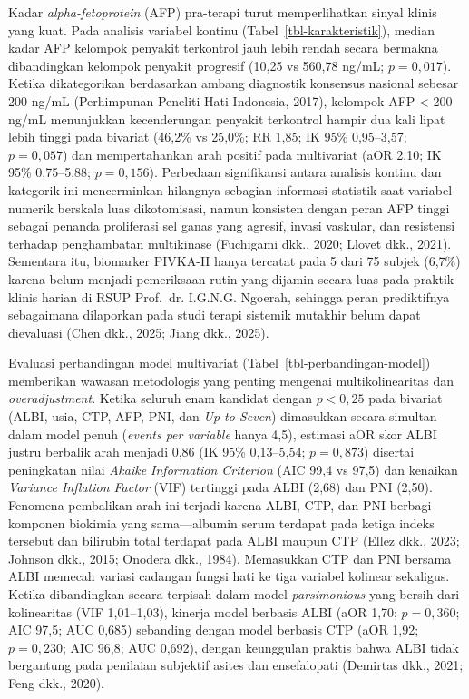 \documentclass[
  indonesian,
]{report}
\begin{document}
Kadar \emph{alpha-fetoprotein} (AFP) pra-terapi turut memperlihatkan
sinyal klinis yang kuat. Pada analisis variabel kontinu
(Tabel~\ref{tbl-karakteristik}), median kadar AFP kelompok penyakit
terkontrol jauh lebih rendah secara bermakna dibandingkan kelompok
penyakit progresif (10,25 vs 560,78 ng/mL; \(p = 0,017\)). Ketika
dikategorikan berdasarkan ambang diagnostik konsensus nasional sebesar
200 ng/mL (Perhimpunan Peneliti Hati Indonesia, 2017), kelompok AFP
\textless{} 200 ng/mL menunjukkan kecenderungan penyakit terkontrol
hampir dua kali lipat lebih tinggi pada bivariat (46,2\% vs 25,0\%; RR
1,85; IK 95\% 0,95--3,57; \(p = 0,057\)) dan mempertahankan arah positif
pada multivariat (aOR 2,10; IK 95\% 0,75--5,88; \(p = 0,156\)).
Perbedaan signifikansi antara analisis kontinu dan kategorik ini
mencerminkan hilangnya sebagian informasi statistik saat variabel
numerik berskala luas dikotomisasi, namun konsisten dengan peran AFP
tinggi sebagai penanda proliferasi sel ganas yang agresif, invasi
vaskular, dan resistensi terhadap penghambatan multikinase (Fuchigami
dkk., 2020; Llovet dkk., 2021). Sementara itu, biomarker PIVKA-II hanya
tercatat pada 5 dari 75 subjek (6,7\%) karena belum menjadi pemeriksaan
rutin yang dijamin secara luas pada praktik klinis harian di RSUP
Prof.~dr. I.G.N.G. Ngoerah, sehingga peran prediktifnya sebagaimana
dilaporkan pada studi terapi sistemik mutakhir belum dapat dievaluasi
(Chen dkk., 2025; Jiang dkk., 2025).

Evaluasi perbandingan model multivariat
(Tabel~\ref{tbl-perbandingan-model}) memberikan wawasan metodologis yang
penting mengenai multikolinearitas dan \emph{overadjustment}. Ketika
seluruh enam kandidat dengan \(p < 0,25\) pada bivariat (ALBI, usia,
CTP, AFP, PNI, dan \emph{Up-to-Seven}) dimasukkan secara simultan dalam
model penuh (\emph{events per variable} hanya 4,5), estimasi aOR skor
ALBI justru berbalik arah menjadi 0,86 (IK 95\% 0,13--5,54;
\(p = 0,873\)) disertai peningkatan nilai \emph{Akaike Information
Criterion} (AIC 99,4 vs 97,5) dan kenaikan \emph{Variance Inflation
Factor} (VIF) tertinggi pada ALBI (2,68) dan PNI (2,50). Fenomena
pembalikan arah ini terjadi karena ALBI, CTP, dan PNI berbagi komponen
biokimia yang sama---albumin serum terdapat pada ketiga indeks tersebut
dan bilirubin total terdapat pada ALBI maupun CTP (Ellez dkk., 2023;
Johnson dkk., 2015; Onodera dkk., 1984). Memasukkan CTP dan PNI bersama
ALBI memecah variasi cadangan fungsi hati ke tiga variabel kolinear
sekaligus. Ketika dibandingkan secara terpisah dalam model
\emph{parsimonious} yang bersih dari kolinearitas (VIF 1,01--1,03),
kinerja model berbasis ALBI (aOR 1,70; \(p = 0,360\); AIC 97,5; AUC
0,685) sebanding dengan model berbasis CTP (aOR 1,92; \(p = 0,230\); AIC
96,8; AUC 0,692), dengan keunggulan praktis bahwa ALBI tidak bergantung
pada penilaian subjektif asites dan ensefalopati (Demirtas dkk., 2021;
Feng dkk., 2020).
\end{document}
